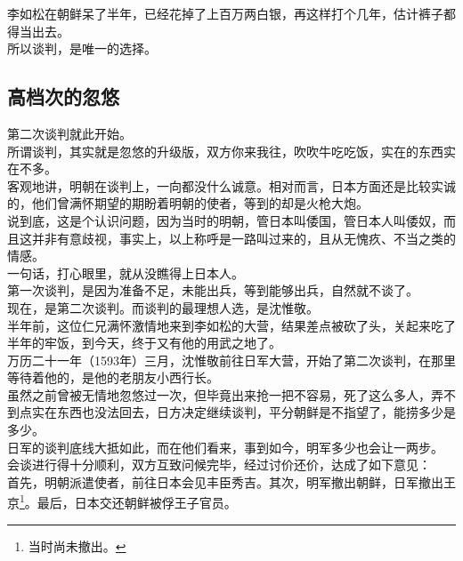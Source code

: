\begin{multicols}{\theparacolNo}
李如松在朝鲜呆了半年，已经花掉了上百万两白银，再这样打个几年，估计裤子都得当出去。\\

所以谈判，是唯一的选择。\\

\subsection{高档次的忽悠}
第二次谈判就此开始。\\

所谓谈判，其实就是忽悠的升级版，双方你来我往，吹吹牛吃吃饭，实在的东西实在不多。\\

客观地讲，明朝在谈判上，一向都没什么诚意。相对而言，日本方面还是比较实诚的，他们曾满怀期望的期盼着明朝的使者，等到的却是火枪大炮。\\

说到底，这是个认识问题，因为当时的明朝，管日本叫倭国，管日本人叫倭奴，而且这并非有意歧视，事实上，以上称呼是一路叫过来的，且从无愧疚、不当之类的情感。\\

一句话，打心眼里，就从没瞧得上日本人。\\

第一次谈判，是因为准备不足，未能出兵，等到能够出兵，自然就不谈了。\\

现在，是第二次谈判。而谈判的最理想人选，是沈惟敬。\\

半年前，这位仁兄满怀激情地来到李如松的大营，结果差点被砍了头，关起来吃了半年的牢饭，到今天，终于又有他的用武之地了。\\

万历二十一年（1593年）三月，沈惟敬前往日军大营，开始了第二次谈判，在那里等待着他的，是他的老朋友小西行长。\\

虽然之前曾被无情地忽悠过一次，但毕竟出来抢一把不容易，死了这么多人，弄不到点实在东西也没法回去，日方决定继续谈判，平分朝鲜是不指望了，能捞多少是多少。\\

日军的谈判底线大抵如此，而在他们看来，事到如今，明军多少也会让一两步。\\

会谈进行得十分顺利，双方互致问候完毕，经过讨价还价，达成了如下意见：\\

首先，明朝派遣使者，前往日本会见丰臣秀吉。其次，明军撤出朝鲜，日军撤出王京\footnote{当时尚未撤出。}。最后，日本交还朝鲜被俘王子官员。\\


\end{multicols}
